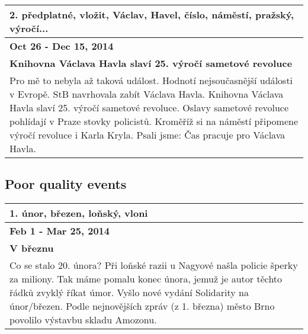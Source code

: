 \par

\begin{tabularx}{\linewidth}{p{\linewidth}} \toprule[1.5pt]
\bf 2. předplatné, vložit, Václav, Havel, číslo, náměstí, pražský, výročí... \\ \midrule
\bf Oct 26 - Dec 15, 2014 \\ \bf Knihovna Václava Havla slaví 25. výročí sametové revoluce \\
Pro mě to nebyla až taková událost. Hodnotí nejsoučasnější události v Evropě. StB navrhovala zabít Václava Havla. Knihovna Václava Havla slaví 25. výročí sametové revoluce. Oslavy sametové revoluce pohlídají v Praze stovky policistů. Kroměříž si na náměstí připomene výročí revoluce i Karla Kryla. Psali jsme: Čas pracuje pro Václava Havla. \\ \bottomrule[1.25pt]
\end{tabularx}

\par

\subsection*{Poor quality events}
\begin{tabularx}{\linewidth}{p{\linewidth}} \toprule[1.5pt]

\bf 1. únor, březen, loňský, vloni \\ \midrule
\bf Feb 1 - Mar 25, 2014 \\ \midrule
\bf V březnu \\
Co se stalo 20. února? Při loňské razii u Nagyové našla policie šperky za miliony. Tak máme pomalu konec února, jemuž je autor těchto řádků zvyklý říkat úmor. Vyšlo nové vydání Solidarity na únor/březen. Podle nejnovějších zpráv (z 1. března) město Brno povolilo výstavbu skladu Amozonu. \\ \bottomrule[1.25pt]
\end{tabularx}

\par
\newpage


